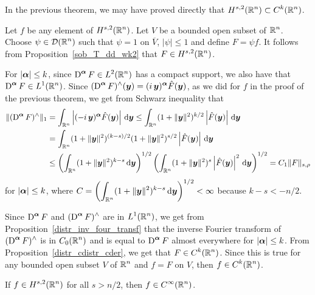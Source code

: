 \begin{rmk}
In the previous theorem, we may have proved directly that 
$\displaystyle H^{s,2}(\mathbb{R}^n) \subset C^k(\mathbb{R}^n)$.

Let $f$ be any element of $\displaystyle H^{s,2}(\mathbb{R}^n)$.  Let $V$ be
a bounded open subset of $\displaystyle \mathbb{R}^n$.  Choose
$\displaystyle \psi \in \mathcal{D}(\mathbb{R}^n)$ such that
$\psi = 1$ on $\overline{V}$,  $|\psi|\leq 1$ and define $F = \psi f$.
It follows from Proposition~\ref{sob_T_dd_wk2} that
$\displaystyle F \in H^{s,2}(\mathbb{R}^n)$.

For $|{\bm{\alpha}}|\leq k$, since
$\displaystyle \operatorname{D}^{{\bm{\alpha}}} F \in L^2(\mathbb{R}^n)$
has a compact support, we also have that
$\displaystyle \operatorname{D}^{{\bm{\alpha}}} F \in L^1(\mathbb{R}^n)$.
Since $\displaystyle (\operatorname{D}^{{\bm{\alpha}}} F)^\wedge({\bm{y}}) =
(i\,{\bm{y}})^{{\bm{\alpha}}} \hat{F}({\bm{y}})$, as we did for $f$ in the proof
of the previous theorem, we get from Schwarz inequality that
\begin{align*}
\| (\operatorname{D}^{{\bm{\alpha}}} F)^\wedge \|_1 &= 
\int_{\mathbb{R}^n} \left| (-i\,{\bm{y}})^{{\bm{\alpha}}} \hat{F}({\bm{y}}) \right|
\,\mathrm{d}{{\bm{y}}}
\leq \int_{\mathbb{R}^n} (1+\|{\bm{y}}\|^2)^{k/2} \left| \hat{F}({\bm{y}}) \right|
\,\mathrm{d}{{\bm{y}}} \\
& = \int_{\mathbb{R}^n} (1+\|{\bm{y}}\|^2)^{(k-s)/2}
 (1+\|{\bm{y}}\|^2)^{s/2} \left| \hat{F}({\bm{y}}) \right| \,\mathrm{d}{{\bm{y}}} \\
&\leq \left( \int_{\mathbb{R}^n} (1+\|{\bm{y}}\|^2)^{k-s} \,\mathrm{d}{{\bm{y}}} \right)^{1/2}
 \left(\int_{\mathbb{R}^n} (1+\|{\bm{y}}\|^2)^s \left|\hat{F}({\bm{y}}) \right|^2
\,\mathrm{d}{{\bm{y}}}\right)^{1/2}
= C_1 \| F \|_{s,\rho}
\end{align*}
for $|{\bm{\alpha}}|\leq k$, where
$\displaystyle
C = \left( \int_{\mathbb{R}^n} (1+\|{\bm{y}}\|^2)^{k-s} \,\mathrm{d}{{\bm{y}}} \right)^{1/2}
< \infty$ because $k-s < -n/2$.

Since
$\displaystyle \operatorname{D}^{{\bm{\alpha}}} F$ and
$\displaystyle (\operatorname{D}^{{\bm{\alpha}}} F)^\wedge$
are in $\displaystyle L^1(\mathbb{R}^n)$, we
get from Proposition~\ref{distr_inv_four_transf} that the inverse Fourier
transform of $\displaystyle (\operatorname{D}^{{\bm{\alpha}}} F)^\wedge$ is in
$\displaystyle C_0(\mathbb{R}^n)$
and is equal to $\displaystyle \operatorname{D}^{{\bm{\alpha}}} F$ almost everywhere
for $|{\bm{\alpha}}| \leq k$.  From Proposition~\ref{distr_cdistr_cder}, we
get that $\displaystyle F\in C^k(\mathbb{R}^n)$.  Since this is true for any
bounded open subset $V$ of $\displaystyle \mathbb{R}^n$ and $f=F$ on $V$, then
$\displaystyle f\in C^k(\mathbb{R}^n)$.
\end{rmk}

\begin{cor}
If $\displaystyle f\in H^{s,2}(\mathbb{R}^n)$ for all $s>n/2$, then
$\displaystyle f\in C^\infty(\mathbb{R}^n)$.
\end{cor}

